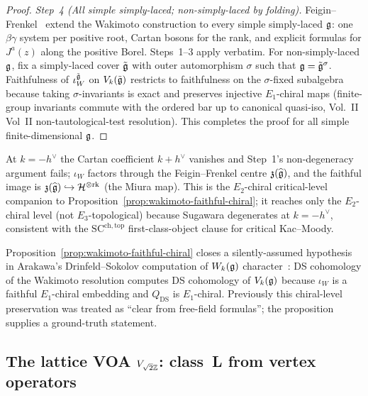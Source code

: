 \begin{proof}
\emph{Step~4 (All simple simply-laced; non-simply-laced by folding).}
Feigin--Frenkel~\cite{FF90} extend the Wakimoto construction
to every simple simply-laced $\mathfrak{g}$: one $\beta\gamma$ system
per positive root, Cartan bosons for the rank, and explicit
formulas for $J^a(z)$ along the positive Borel. Steps~1--3
apply verbatim. For non-simply-laced $\mathfrak{g}$, fix a
simply-laced cover $\tilde{\mathfrak{g}}$ with outer automorphism
$\sigma$ such that $\mathfrak{g} = \tilde{\mathfrak{g}}^\sigma$. Faithfulness
of $\iota_W^{\tilde{\mathfrak{g}}}$ on $V_k(\tilde{\mathfrak{g}})$ restricts to
faithfulness on the $\sigma$-fixed subalgebra because taking
$\sigma$-invariants is exact and preserves injective
$E_1$-chiral maps (finite-group invariants commute with the
ordered bar up to canonical quasi-iso, Vol.~II
Vol~II non-tautological-test resolution). This completes the proof for all
simple finite-dimensional $\mathfrak{g}$.
\end{proof}

\begin{remark}\label{rem:wakimoto-critical-level}
At $k = -h^\vee$ the Cartan coefficient $k+h^\vee$ vanishes
and Step~1's non-degeneracy argument fails; $\iota_W$ factors
through the Feigin--Frenkel centre
$\mathfrak{z}(\widehat{\mathfrak{g}})$, and the faithful image is
$\mathfrak{z}(\widehat{\mathfrak{g}}) \hookrightarrow
\mathcal{H}^{\otimes\mathrm{rk}}$ (the Miura map). This is the
$E_2$-chiral critical-level companion to
Proposition~\ref{prop:wakimoto-faithful-chiral}; it reaches
only the $E_2$-chiral level (not $E_3$-topological) because
Sugawara degenerates at $k=-h^\vee$, consistent with the
$\mathrm{SC}^{\mathrm{ch,top}}$ first-class-object clause
for critical Kac--Moody.
\end{remark}

\begin{remark}\label{rem:wakimoto-ds-consequence}
Proposition~\ref{prop:wakimoto-faithful-chiral} closes a
silently-assumed hypothesis in Arakawa's
Drinfeld--Sokolov computation of $W_k(\mathfrak{g})$
character~\cite{Arakawa07}: DS cohomology of the Wakimoto
resolution computes DS cohomology of $V_k(\mathfrak{g})$ because
$\iota_W$ is a faithful $E_1$-chiral embedding and
$Q_{\mathrm{DS}}$ is $E_1$-chiral. Previously this chiral-level
preservation was treated as ``clear from free-field formulas'';
the proposition supplies a ground-truth statement.
\end{remark}

\subsection{The lattice VOA $V_{\sqrt{2}\mathbb{Z}}$: class~L from vertex operators}%
\label{subsec:lattice-voa-ordered-bar}%
%

